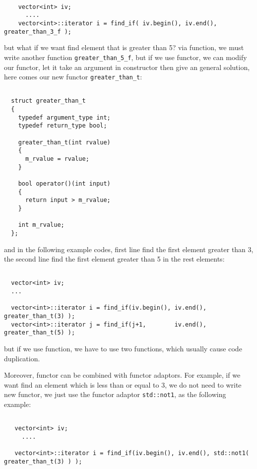\documentclass[letterpaper]{book}
\begin{document}
\begin{lstlisting}

    vector<int> iv;
      ....
    vector<int>::iterator i = find_if( iv.begin(), iv.end(), greater_than_3_f );

\end{lstlisting}

but what if we want find element that is greater than 5? via function, we must
write another function \lstinline$greater_than_5_f$, but if we use functor, we 
can modify our functor, let it take an argument in constructor then give an general
solution, here comes our new functor \lstinline$greater_than_t$:

\begin{lstlisting}

  struct greater_than_t
  {
    typedef argument_type int;
    typedef return_type bool;

    greater_than_t(int rvalue)
    {
      m_rvalue = rvalue;
    }

    bool operator()(int input)
    {
      return input > m_rvalue;
    }

    int m_rvalue;
  };

\end{lstlisting}

and in the following example codes, first line find the first element greater than 3,
the second line find the first element greater than 5 in the rest elements:

\begin{lstlisting}

  vector<int> iv;
  ...

  vector<int>::iterator i = find_if(iv.begin(), iv.end(), greater_than_t(3) );
  vector<int>::iterator j = find_if(j+1,        iv.end(), greater_than_t(5) );

\end{lstlisting}

but if we use function, we have to use two functions, which usually cause code duplication.

Moreover, functor can be combined with functor adaptors. For example, if we want find an element which
is less than or equal to 3, we do not need to write new functor, we just use the functor adaptor
\lstinline$std::not1$, as the following example:

\begin{lstlisting}

   vector<int> iv;
     ....

   vector<int>::iterator i = find_if(iv.begin(), iv.end(), std::not1( greater_than_t(3) ) );

\end{lstlisting}
\end{document}
